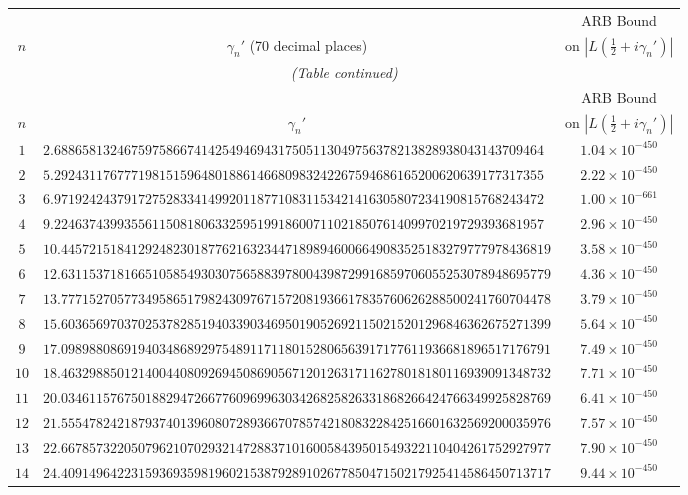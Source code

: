 \documentclass[12pt,reqno]{amsart}
\theoremstyle{remark}
\begin{document}
\begin{longtable}{clc}
\toprule
 & & ARB Bound \\
$n$ & \multicolumn{1}{c}{$\gamma_n'$ (70 decimal places)} & on $|L(\tfrac{1}{2}+i\gamma_n')|$ \\
\midrule
\endfirsthead
\multicolumn{3}{c}{\small\itshape (Table continued)} \\
\toprule
 & & ARB Bound \\
$n$ & \multicolumn{1}{c}{$\gamma_n'$} & on $|L(\tfrac{1}{2}+i\gamma_n')|$ \\
\midrule
\endhead
\bottomrule
\endlastfoot
$1$ & $2.6886581324675975866741425494694317505113049756378213828938043143709464$ & $1.04\times 10^{-450}$ \\
$2$ & $5.2924311767771981515964801886146680983242267594686165200620639177317355$ & $2.22\times 10^{-450}$ \\
$3$ & $6.9719242437917275283341499201187710831153421416305807234190815768243472$ & $1.00\times 10^{-661}$ \\
$4$ & $9.2246374399355611508180633259519918600711021850761409970219729393681957$ & $2.96\times 10^{-450}$ \\
$5$ & $10.4457215184129248230187762163234471898946006649083525183279777978436819$ & $3.58\times 10^{-450}$ \\
$6$ & $12.6311537181665105854930307565883978004398729916859706055253078948695779$ & $4.36\times 10^{-450}$ \\
$7$ & $13.7771527057734958651798243097671572081936617835760626288500241760704478$ & $3.79\times 10^{-450}$ \\
$8$ & $15.6036569703702537828519403390346950190526921150215201296846362675271399$ & $5.64\times 10^{-450}$ \\
$9$ & $17.0989880869194034868929754891171180152806563917177611936681896517176791$ & $7.49\times 10^{-450}$ \\
$10$ & $18.4632988501214004408092694508690567120126317116278018180116939091348732$ & $7.71\times 10^{-450}$ \\
$11$ & $20.0346115767501882947266776096996303426825826331868266424766349925828769$ & $6.41\times 10^{-450}$ \\
$12$ & $21.5554782421879374013960807289366707857421808322842516601632569200035976$ & $7.57\times 10^{-450}$ \\
$13$ & $22.6678573220507962107029321472883710160058439501549322110404261752927977$ & $7.90\times 10^{-450}$ \\
$14$ & $24.4091496422315936935981960215387928910267785047150217925414586450713717$ & $9.44\times 10^{-450}$ \\

\end{longtable}
\end{document}
